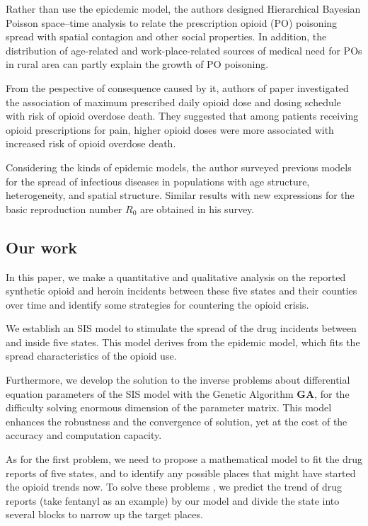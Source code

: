 Rather than use the epicdemic model, the authors \cite{5} designed Hierarchical Bayesian Poisson space–time analysis to relate the prescription opioid (PO) poisoning spread with spatial contagion and other social properties. In addition, the distribution of age-related and work-place-related sources of medical need for POs in rural area can partly explain the growth of PO poisoning.

From the pespective of consequence caused by it, authors of paper \cite{4} investigated the association of maximum prescribed daily opioid dose and dosing schedule with risk of opioid overdose death. They suggested that among patients receiving opioid prescriptions for pain, higher opioid doses were more associated with increased risk of opioid overdose death.

Considering the kinds of epidemic models, the author \cite{6} surveyed previous models for the spread of infectious diseases in populations with age structure, heterogeneity, and spatial structure. Similar results with new expressions for the basic reproduction number $R_0$ are obtained in his survey.

\subsection{Our work}
In this paper, we make a quantitative and qualitative analysis on the reported synthetic opioid and heroin incidents between these five states and their counties over time and identify some strategies for countering the opioid crisis.

We establish an SIS model to stimulate the spread of the drug incidents between and inside five states. This model derives from the epidemic model, which fits the spread characteristics of the opioid use.

Furthermore, we develop the solution to the inverse problems about differential equation parameters of the SIS model with the Genetic Algorithm \textbf{GA}, for the difficulty solving enormous dimension of the parameter matrix. This model enhances the robustness and the convergence of solution, yet at the cost of the accuracy and computation capacity. 

As for the first problem, we need to propose a mathematical model to fit the drug reports of five states, and to identify any possible places that might have started the opioid trends now. To solve these problems , we predict the trend of drug reports (take fentanyl as an example) by our model and divide the state into several blocks to narrow up the target places.

